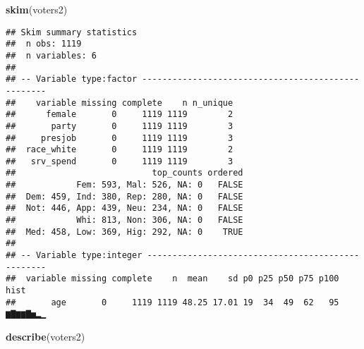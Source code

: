 \documentclass[]{article}
\newenvironment{Shaded}{\begin{snugshade}}{\end{snugshade}}
\newcommand{\KeywordTok}[1]{\textcolor[rgb]{0.13,0.29,0.53}{\textbf{{#1}}}}
\newcommand{\NormalTok}[1]{{#1}}
\begin{document}
\begin{Shaded}
\begin{Highlighting}[]
\KeywordTok{skim}\NormalTok{(voters2)}
\end{Highlighting}
\end{Shaded}

\begin{verbatim}
## Skim summary statistics
##  n obs: 1119 
##  n variables: 6 
## 
## -- Variable type:factor ---------------------------------------------------
##    variable missing complete    n n_unique
##      female       0     1119 1119        2
##       party       0     1119 1119        3
##     presjob       0     1119 1119        3
##  race_white       0     1119 1119        2
##   srv_spend       0     1119 1119        3
##                           top_counts ordered
##            Fem: 593, Mal: 526, NA: 0   FALSE
##  Dem: 459, Ind: 380, Rep: 280, NA: 0   FALSE
##  Not: 446, App: 439, Neu: 234, NA: 0   FALSE
##            Whi: 813, Non: 306, NA: 0   FALSE
##  Med: 458, Low: 369, Hig: 292, NA: 0    TRUE
## 
## -- Variable type:integer --------------------------------------------------
##  variable missing complete    n  mean    sd p0 p25 p50 p75 p100     hist
##       age       0     1119 1119 48.25 17.01 19  34  49  62   95 ▆▇▆▆▇▅▂▁
\end{verbatim}

\begin{Shaded}
\begin{Highlighting}[]
\KeywordTok{describe}\NormalTok{(voters2)}
\end{Highlighting}
\end{Shaded}
\end{document}
